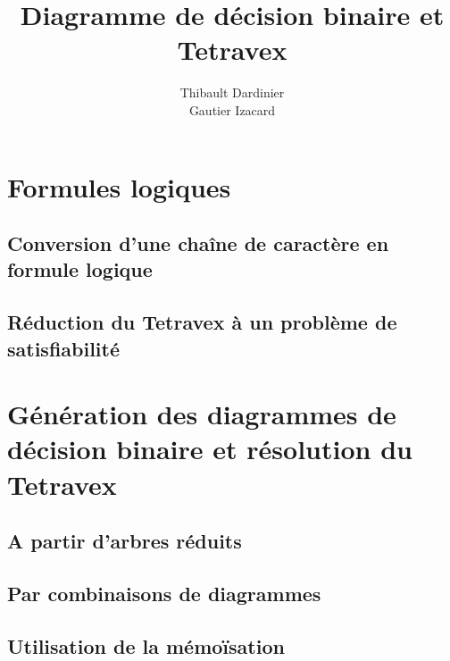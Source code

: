 \documentclass[11pt]{article}
\begin{document}
\title{Diagramme de décision binaire et Tetravex}
\author{Thibault Dardinier\\Gautier Izacard}
\maketitle
\tableofcontents
\newpage

\section{Formules logiques}
\subsection{Conversion d'une chaîne de caractère en formule logique}
\subsection{Réduction du Tetravex à un problème de satisfiabilité}

\section{Génération des diagrammes de décision binaire et résolution du Tetravex}
\subsection{A partir d'arbres réduits}
\subsection{Par combinaisons de diagrammes}
\subsection{Utilisation de la mémoïsation}
\end{document}
